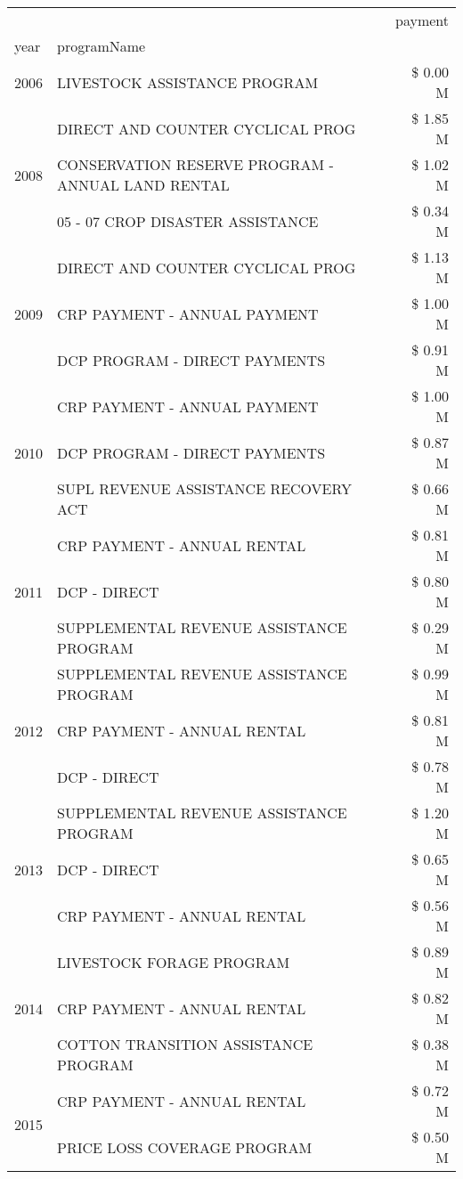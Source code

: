 \begin{tabular}{llr}
\toprule
 &  & payment \\
year & programName &  \\
\midrule
2006 & LIVESTOCK ASSISTANCE PROGRAM & \$ 0.00 M \\
\cline{1-3}
\multirow[t]{3}{*}{2008} & DIRECT AND COUNTER CYCLICAL PROG & \$ 1.85 M \\
 & CONSERVATION RESERVE PROGRAM - ANNUAL LAND RENTAL & \$ 1.02 M \\
 & 05 - 07 CROP DISASTER ASSISTANCE & \$ 0.34 M \\
\cline{1-3}
\multirow[t]{3}{*}{2009} & DIRECT AND COUNTER CYCLICAL PROG & \$ 1.13 M \\
 & CRP PAYMENT - ANNUAL PAYMENT & \$ 1.00 M \\
 & DCP PROGRAM - DIRECT PAYMENTS & \$ 0.91 M \\
\cline{1-3}
\multirow[t]{3}{*}{2010} & CRP PAYMENT - ANNUAL PAYMENT & \$ 1.00 M \\
 & DCP PROGRAM - DIRECT PAYMENTS & \$ 0.87 M \\
 & SUPL REVENUE ASSISTANCE RECOVERY ACT & \$ 0.66 M \\
\cline{1-3}
\multirow[t]{3}{*}{2011} & CRP PAYMENT - ANNUAL RENTAL & \$ 0.81 M \\
 & DCP - DIRECT & \$ 0.80 M \\
 & SUPPLEMENTAL REVENUE ASSISTANCE PROGRAM & \$ 0.29 M \\
\cline{1-3}
\multirow[t]{3}{*}{2012} & SUPPLEMENTAL REVENUE ASSISTANCE PROGRAM & \$ 0.99 M \\
 & CRP PAYMENT - ANNUAL RENTAL & \$ 0.81 M \\
 & DCP - DIRECT & \$ 0.78 M \\
\cline{1-3}
\multirow[t]{3}{*}{2013} & SUPPLEMENTAL REVENUE ASSISTANCE PROGRAM & \$ 1.20 M \\
 & DCP - DIRECT & \$ 0.65 M \\
 & CRP PAYMENT - ANNUAL RENTAL & \$ 0.56 M \\
\cline{1-3}
\multirow[t]{3}{*}{2014} & LIVESTOCK FORAGE PROGRAM & \$ 0.89 M \\
 & CRP PAYMENT - ANNUAL RENTAL & \$ 0.82 M \\
 & COTTON TRANSITION ASSISTANCE PROGRAM & \$ 0.38 M \\
\cline{1-3}
\multirow[t]{3}{*}{2015} & CRP PAYMENT - ANNUAL RENTAL & \$ 0.72 M \\
 & PRICE LOSS COVERAGE PROGRAM & \$ 0.50 M \\

\end{tabular}
